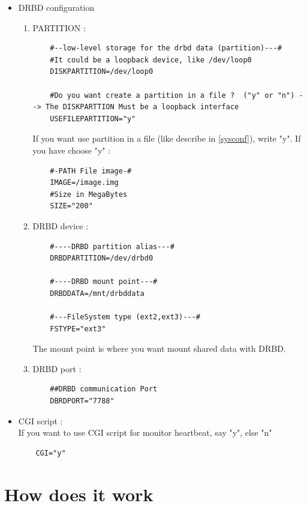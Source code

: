 \documentclass[a4paper,10pt]{report}
\begin{document}
\begin{itemize}
 \item DRBD configuration
\begin{enumerate}
 \item PARTITION :\\
  \begin{lstlisting}
    #--low-level storage for the drbd data (partition)---#
    #It could be a loopback device, like /dev/loop0
    DISKPARTITION=/dev/loop0

    #Do you want create a partition in a file ?  ("y" or "n") --> The DISKPARTTION Must be a loopback interface
    USEFILEPARTITION="y"
  \end{lstlisting}
If you want use partition in a file (like describe in \ref{sysconf}), write "y". If you have choose "y" :
  \begin{lstlisting}
    #-PATH File image-#
    IMAGE=/image.img
    #Size in MegaBytes
    SIZE="200"
  \end{lstlisting}
  
  \item DRBD device :\\
  \begin{lstlisting}
    #----DRBD partition alias---#
    DRBDPARTITION=/dev/drbd0

    #----DRBD mount point---#
    DRBDDATA=/mnt/drbddata

    #---FileSystem type (ext2,ext3)---#
    FSTYPE="ext3"
  \end{lstlisting}
The mount point is where you want mount shared data with DRBD.

  \item DRBD port :\\
  \begin{lstlisting}
    ##DRBD communication Port
    DBRDPORT="7788"
  \end{lstlisting}
  
\end{enumerate}

\item CGI script :\\
  If you want to use CGI script for monitor heartbeat, say "y", else "n"
  \begin{lstlisting}
    CGI="y"
  \end{lstlisting}

\end{itemize}



\section{How does it work}
\end{document}
